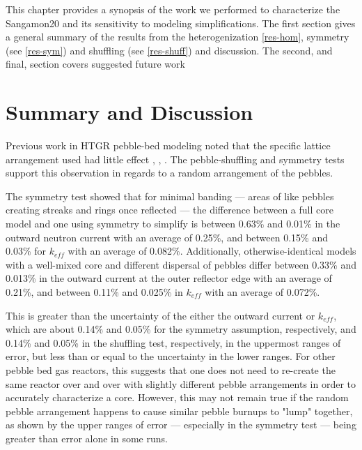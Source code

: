 This chapter provides a synopsis of the work we performed to characterize the Sangamon20 and its sensitivity to modeling simplifications.  The first section gives a general summary of the results from the heterogenization \autoref{res-hom}, symmetry (see \autoref{res-sym}) and shuffling (see \autoref{res-shuff}) and discussion.  The second, and final, section covers suggested future work

\section{Summary and Discussion}

Previous work in HTGR pebble-bed modeling noted that the specific lattice arrangement used had little effect \cite{turkmen_effect_2012}, \cite{karriem_mcnp_2001}, \cite{brown_stochastic_2005}.  The pebble-shuffling and symmetry tests support this observation in regards to a  random arrangement of the pebbles.

The symmetry test showed that for minimal banding --- areas of like pebbles creating streaks and rings once reflected --- the difference between a full core model and one using symmetry to simplify is between 0.63\% and 0.01\% in the outward neutron current with an average of 0.25\%, and between 0.15\% and 0.03\% for $k_{eff}$ with an average of 0.082\%.  Additionally, otherwise-identical models with a well-mixed core and different dispersal of pebbles differ between 0.33\% and 0.013\% in the outward current at the outer reflector edge with an average of 0.21\%, and between 0.11\% and 0.025\% in $k_{eff}$ with an average of 0.072\%.  

This is greater than the uncertainty of the either the outward current or $k_{eff}$, which are about 0.14\% and 0.05\% for the symmetry assumption, respectively, and 0.14\% and 0.05\% in the shuffling test, respectively, in the uppermost ranges of error, but less than or equal to the uncertainty in the lower ranges. For other pebble bed gas reactors, this suggests that one does not need to re-create the same reactor over and over with slightly different pebble arrangements in order to accurately characterize a core.  However, this may not remain true if the random pebble arrangement happens to cause similar pebble burnups to "lump" together, as shown by the upper ranges of error --- especially in the symmetry test --- being greater than error alone in some runs.

